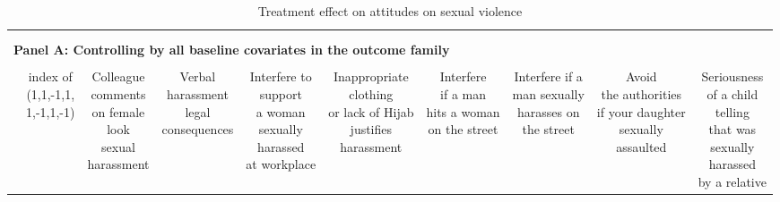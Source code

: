 \documentclass[12pt]{article}
\begin{document}
\begin{table}
\centering 
\vspace*{-1cm}   \caption{Treatment effect on attitudes on sexual violence} 
  \label{} 
\scriptsize 
\begin{tabular}{@{\extracolsep{0pt}}lccccccccc} 
\\[-1.8ex]\hline 
\hline \\[-1.8ex] 
\\[-0.5ex] 
\multicolumn{10}{l}{\textbf{Panel A: Controlling by all baseline covariates in the outcome family}} \\
\hline \\[-1ex] 
 & \shortstack{index of \\ (1,1,-1,1,\\1,-1,1,-1)} & \shortstack{Colleague \\ comments \\ on female \\ look \\ sexual \\ harassment} & \shortstack{Verbal \\ harassment\\ legal \\consequences} & \shortstack{Interfere to \\ support \\a woman \\ sexually \\harassed \\ at workplace} & \shortstack{Inappropriate\\ clothing \\ or lack of Hijab \\ justifies \\ harassment} & \shortstack{Interfere \\ if a man \\ hits a woman \\ on the street} & \shortstack{Interfere if a \\man sexually \\ harasses  on\\ the street} & \shortstack{Avoid \\ the authorities \\ if your daughter \\ sexually \\ assaulted} & \shortstack{Seriousness \\ of a child \\ telling \\ that was \\ sexually \\harassed\\ by a relative} \\ 

\end{tabular}
\end{table}
\end{document}
